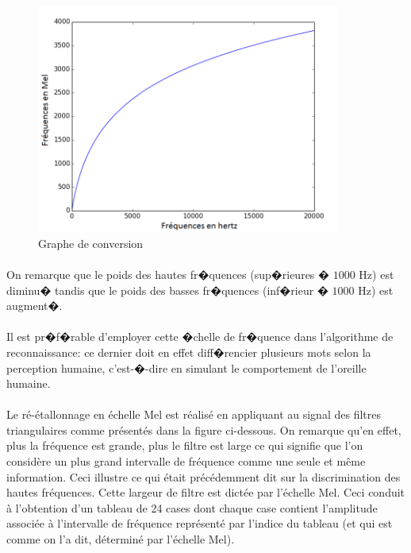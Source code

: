         	\begin{figure}[H]
						\begin{center}
							\includegraphics[width=10cm]{Images/Mel.png} 
						\end{center}
						\caption{Graphe de conversion}
			\end{figure}
        	\paragraph{}
        	On remarque que le poids des hautes fr�quences (sup�rieures � $1 000$ Hz) est diminu� tandis que le poids des basses fr�quences (inf�rieur � $1 000$ Hz) est augment�.
\paragraph{}
	Il est pr�f�rable d'employer cette �chelle de fr�quence dans l'algorithme de reconnaissance: ce dernier doit en effet diff�rencier plusieurs mots selon la perception humaine, c'est-�-dire en simulant le comportement de l'oreille humaine.

\paragraph{}
	Le ré-étallonnage en échelle Mel est réalisé en appliquant au signal des filtres triangulaires comme présentés
	dans la figure ci-dessous. On remarque qu'en effet, plus la fréquence est grande, plus le filtre est large ce qui 
	signifie que l'on considère un plus grand intervalle de fréquence comme une seule et même information. Ceci 
	illustre ce qui était précédemment dit sur la discrimination des hautes fréquences. Cette largeur de filtre est 
	dictée par l'échelle Mel. Ceci conduit à l'obtention d'un tableau de 24 cases dont chaque case contient l'amplitude 
	associée à l'intervalle de fréquence représenté par l'indice du tableau (et qui est comme on l'a dit, déterminé
	par l'échelle Mel).
	
